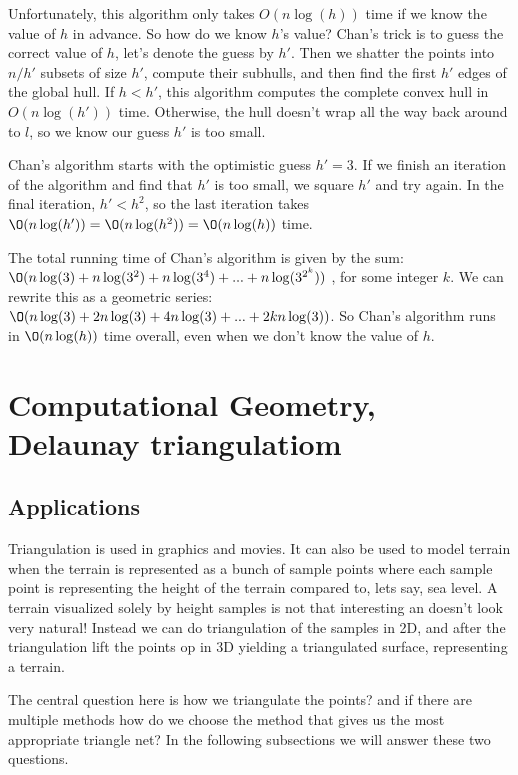 \documentclass[10pt]{article}
\begin{document}
Unfortunately, this algorithm only takes $O(n\log(h))$ time if we know the value of $h$ in advance. So how do we know $h$'s value? Chan's trick is to guess the correct value of $h$, let's denote the guess by $h'$. Then we shatter the points into $n/h'$ subsets of size $h'$, compute their subhulls, and then find the first $h'$ edges of the global hull. If $h < h'$, this algorithm computes the complete convex hull in $O(n\log(h'))$ time. Otherwise, the hull doesn't wrap all the way back around to $l$, so we know our guess $h'$ is too small.

Chan's algorithm starts with the optimistic guess $h' = 3$. If we finish an iteration of the algorithm and find that $h'$ is too small, we square $h'$ and try again. In the final iteration, $h'<h^2$, so the last iteration takes $\O(n\log(h')) = \O(n\log(h^2)) = \O(n\log(h))$ time.

The total running time of Chan's algorithm is given by the sum: $\O(n\log(3) + n\log(3^2) + n\log(3^4) + ... + n\log(3^{2^k}))$ , for some integer $k$. We can rewrite this as a geometric series: $\O(n\log(3) + 2n\log(3) + 4n\log(3) + ... + 2kn\log(3))$. So Chan's algorithm runs in $\O(n\log(h))$ time overall, even when we don't know the value of $h$.




\clearpage \newpage
\section{Computational Geometry, Delaunay triangulatiom} %
\label{sec:computational_geometry_delaunay_triangulatiom}


\subsection{Applications} %
\label{sub:applications}
Triangulation is used in graphics and movies. It can also be used to model terrain when the terrain is represented as a bunch of sample points where each sample point is representing the height of the terrain compared to, lets say, sea level. A terrain visualized solely by height samples is not that interesting an doesn't look very natural! Instead we can do triangulation of the samples in 2D, and after the triangulation lift the points op in 3D yielding a triangulated surface, representing a terrain. 

The central question here is how we triangulate the points? and if there are multiple methods how do we choose the method that gives us the most appropriate triangle net? In the following subsections we will answer these two questions.
\end{document}
